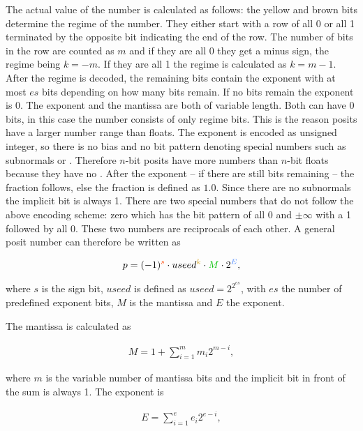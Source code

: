 \documentclass{article}
\theoremstyle{plain} %
\theoremstyle{convention} %
\theoremstyle{remark} %
\numberwithin{equation}{section}
\begin{document}
The actual value of the number is calculated as follows: the yellow and brown bits determine the regime of the number. They either start with a \textcolor{cyellow}{row of all \num{0} or all \num{1}} terminated by the \textcolor{cbrown}{opposite bit} indicating the end of the row. The number of bits in the row are counted as $m$ and if they are all \num{0} they get a minus sign, the regime being $k=-m$. If they are all \num{1} the regime is calculated as $k=m-1$. After the regime is decoded, the remaining bits contain the exponent with at most $es$ bits depending on how many bits remain. If no bits remain the exponent is \num{0}. The exponent and the mantissa are both of variable length. Both can have \num{0} bits, in this case the number consists of only regime bits. This is the reason posits have a larger number range than floats. The exponent is encoded as unsigned integer, so there is no bias and no bit pattern denoting special numbers such as subnormals or . Therefore $n$-bit posits have more numbers than $n$-bit floats because they have no . After the exponent -- if there are still bits remaining -- the fraction follows, else the fraction is defined as $1.0$. Since there are no subnormals the implicit bit is always \num{1}. There are two special numbers that do not follow the above encoding scheme: zero which has the bit pattern of all \num{0} and $\pm \infty$ with a \num{1} followed by all \num{0}. These two numbers are reciprocals of each other. A general posit number can therefore be written as

\begin{align*}
    p = (-1)^{\textcolor{corange}{s}} \cdot useed^{\textcolor{cyellow}{k}} \cdot \textcolor{cgreen}{M} \cdot 2^{\textcolor{cblue}{E}},
\end{align*}

where $s$ is the sign bit, $useed$ is defined as $useed = 2^{2^{es}}$, with $es$ the number of predefined exponent bits, $M$ is the mantissa and $E$ the exponent.

The mantissa is calculated as

\begin{align*}
    M = 1 + \sum_{i=1}^{m} m_{i} 2^{m-i},
\end{align*}

where $m$ is the variable number of mantissa bits and the implicit bit in front of the sum is always \num{1}. The exponent is

\begin{align*}
    E = \sum_{i=1}^{e} e_{i} 2^{e-i},
\end{align*}
\end{document}
